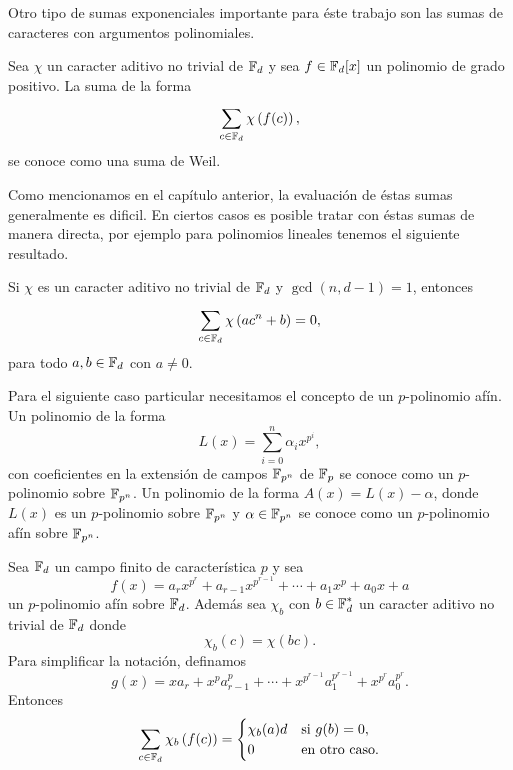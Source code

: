 Otro tipo de sumas exponenciales importante para éste
trabajo son las sumas de caracteres con argumentos
polinomiales.
\begin{definition}
  Sea $\chi$ un caracter aditivo no trivial de $\operatorname{\mathbb{F}}_d$ y sea
  $f \in \operatorname{\mathbb{F}}_d[x]$ un polinomio de grado positivo. La suma de
  la forma
  \begin{equation}
    \sum_{c \in \operatorname{\mathbb{F}}_d}^{} \chi\left( f(c) \right),
  \end{equation}
  se conoce como una suma de Weil.
\end{definition} 
Como mencionamos en el capítulo anterior, la evaluación de
éstas sumas generalmente es dificil. En ciertos casos es
posible tratar con éstas sumas de manera directa, por
ejemplo para polinomios lineales tenemos el siguiente
resultado.
\begin{theorem}
  \label{thm:lidl_linear_sum}
  Si $\chi$ es un caracter aditivo no trivial de $\operatorname{\mathbb{F}}_d$ y
  $\gcd(n,d-1) = 1$, entonces
  \begin{equation}
    \sum_{c \in \operatorname{\mathbb{F}}_d}^{} \chi\left( a c^{n} + b \right) 
    = 0,
  \end{equation}
  para todo $a,b \in \operatorname{\mathbb{F}}_d$ con $a \neq 0$.
\end{theorem}
Para el siguiente caso particular necesitamos el concepto de un
$p$-polinomio afín. Un polinomio de la forma
\begin{equation}
  L(x)
  = \sum_{i = 0}^{n} \alpha_i x^{p^{i}},
\end{equation}
con coeficientes en la extensión de campos $\operatorname{\mathbb{F}}_{p^{n}}$ de
$\operatorname{\mathbb{F}}_p$ se conoce como un $p$-polinomio sobre $\operatorname{\mathbb{F}}_{p^{n}}$.
Un polinomio de la forma $A(x) = L(x) - \alpha$, donde
$L(x)$ es un $p$-polinomio sobre $\operatorname{\mathbb{F}}_{p^{n}}$ y $\alpha \in
\operatorname{\mathbb{F}}_{p^{n}}$ se conoce como un $p$-polinomio afín sobre
$\operatorname{\mathbb{F}}_{p^{n}}$.
\begin{theorem}
  \label{thm:lidl_weil_poly}
  Sea $\operatorname{\mathbb{F}}_d$ un campo finito de característica $p$ y sea
  \begin{equation}
    f(x) = a_r x^{p^{r}} + a_{r-1} x^{p^{r-1}} + \cdots +
    a_1 x^{p} + a_0 x + a
  \end{equation}
  un $p$-polinomio afín sobre $\operatorname{\mathbb{F}}_d$. Además sea $\chi_b$
  con $b \in \operatorname{\mathbb{F}}_d^{*}$ un caracter aditivo no trivial de
  $\operatorname{\mathbb{F}}_d$ donde
  \begin{equation}
    \chi_b(c) = \chi(bc).
  \end{equation}
  Para simplificar la notación, definamos 
  \[
    g(x)
    = x a_r + x^{p} a_{r-1}^{p} + \cdots +
    x^{p^{r-1}}a_1^{p^{r-1}} + x^{p^{r}}a_0^{p^{r}}.
  \] 
  Entonces
  \begin{equation}
    \sum_{c \in \operatorname{\mathbb{F}}_d}^{} \chi_b\left( f(c) \right) 
    = 
    \begin{cases}
      \chi_b(a) d & \text{si } g(b) = 0, \\
      0 & \text{en otro caso}.
    \end{cases}
  \end{equation}
\end{theorem}

